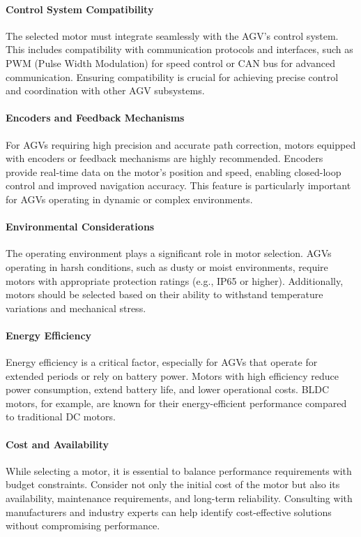 \documentclass[../../main]{subfiles}
\begin{document}
\paragraph{Control System Compatibility}
The selected motor must integrate seamlessly with the AGV's control system. This includes compatibility with communication protocols and interfaces, such as PWM (Pulse Width Modulation) for speed control or CAN bus for advanced communication. Ensuring compatibility is crucial for achieving precise control and coordination with other AGV subsystems.

\paragraph{Encoders and Feedback Mechanisms}
For AGVs requiring high precision and accurate path correction, motors equipped with encoders or feedback mechanisms are highly recommended. Encoders provide real-time data on the motor's position and speed, enabling closed-loop control and improved navigation accuracy. This feature is particularly important for AGVs operating in dynamic or complex environments.

\paragraph{Environmental Considerations}
The operating environment plays a significant role in motor selection. AGVs operating in harsh conditions, such as dusty or moist environments, require motors with appropriate protection ratings (e.g., IP65 or higher). Additionally, motors should be selected based on their ability to withstand temperature variations and mechanical stress.

\paragraph{Energy Efficiency}
Energy efficiency is a critical factor, especially for AGVs that operate for extended periods or rely on battery power. Motors with high efficiency reduce power consumption, extend battery life, and lower operational costs. BLDC motors, for example, are known for their energy-efficient performance compared to traditional DC motors.

\paragraph{Cost and Availability}
While selecting a motor, it is essential to balance performance requirements with budget constraints. Consider not only the initial cost of the motor but also its availability, maintenance requirements, and long-term reliability. Consulting with manufacturers and industry experts can help identify cost-effective solutions without compromising performance.
\end{document}

